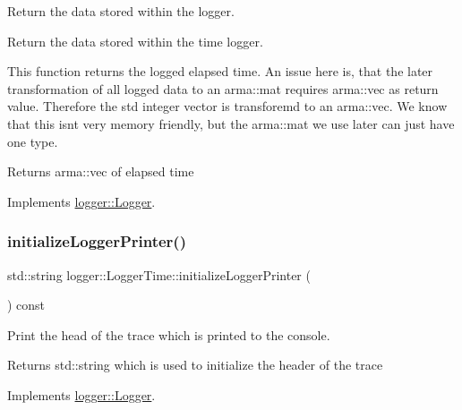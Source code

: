 Return the data stored within the logger. 

Return the data stored within the time logger.

This function returns the logged elapsed time. An issue here is, that the later transformation of all logged data to an {\ttfamily arma\+::mat} requires {\ttfamily arma\+::vec} as return value. Therefore the std integer vector is transforemd to an {\ttfamily arma\+::vec}. We know that this isn\textquotesingle{}t very memory friendly, but the {\ttfamily arma\+::mat} we use later can just have one type.

\begin{DoxyReturn}{Returns}
{\ttfamily arma\+::vec} of elapsed time 
\end{DoxyReturn}


Implements \mbox{\hyperlink{classlogger_1_1_logger_aa4fc254c532172db3404b7c0bcd17092}{logger\+::\+Logger}}.

\mbox{\label{classlogger_1_1_logger_time_a3b3c55f2ff14363a93f9ac0a2e23e1df}} 
\subsubsection{\texorpdfstring{initialize\+Logger\+Printer()}{initializeLoggerPrinter()}}
{\footnotesize\ttfamily std\+::string logger\+::\+Logger\+Time\+::initialize\+Logger\+Printer (\begin{DoxyParamCaption}{ }\end{DoxyParamCaption}) const\hspace{0.3cm}{\ttfamily [virtual]}}



Print the head of the trace which is printed to the console. 

\begin{DoxyReturn}{Returns}
{\ttfamily std\+::string} which is used to initialize the header of the trace 
\end{DoxyReturn}


Implements \mbox{\hyperlink{classlogger_1_1_logger_a825f96e8564ac4013ff09ef842c0aeec}{logger\+::\+Logger}}.

\mbox{\label{classlogger_1_1_logger_time_aec35d7d3c780043ff2b7c9f71712abbc}} 
